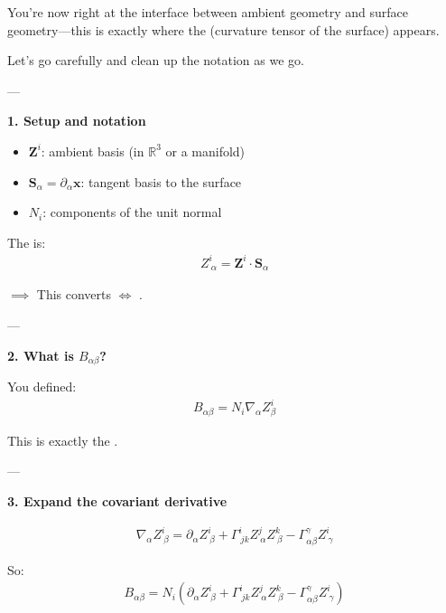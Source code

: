 \documentclass[12pt,a4paper]{report}
\begin{document}
\begin{description}
\begin{description}
You’re now right at the interface between ambient geometry and surface geometry—this is exactly where the  (curvature tensor of the surface) appears.

Let’s go carefully and clean up the notation as we go.

---

\begin{description}
\item \textbf{1. Setup and notation}

\begin{itemize}
\item $\mathbf{Z}^i$: ambient basis (in $\mathbb{R}^3$ or a manifold)
\item $\mathbf{S}_\alpha = \partial_\alpha \mathbf{x}$: tangent basis to the surface
\item $N_i$: components of the unit normal
\end{itemize}

The  is:
\begin{align*}
Z^i_{\ \alpha} = \mathbf{Z}^i \cdot \mathbf{S}_\alpha
\end{align*}

$\implies$ This converts  $\iff$ .

---

\item \textbf{2. What is $B_{\alpha\beta}$?}

You defined:
\begin{align*}
B_{\alpha\beta} = N_i \nabla_\alpha Z^i_{ \beta}
\end{align*}

This is exactly the .

---

\item \textbf{3. Expand the covariant derivative}

\begin{align*}
\nabla_\alpha Z^i_{\ \beta} = \partial_\alpha Z^i_{\ \beta} + \Gamma^i_{\ jk} Z^j_{\ \alpha} Z^k_{\ \beta} - \Gamma^\gamma_{\alpha\beta} Z^i_{\ \gamma}
\end{align*}

So:
\begin{align*}
B_{\alpha\beta} = N_i\left( \partial_\alpha Z^i_{\ \beta} + \Gamma^i_{\ jk} Z^j_{\ \alpha} Z^k_{\ \beta} - \Gamma^\gamma_{\alpha\beta} Z^i_{\ \gamma} \right)
\end{align*}


\end{description}
\end{description}
\end{description}
\end{document}
